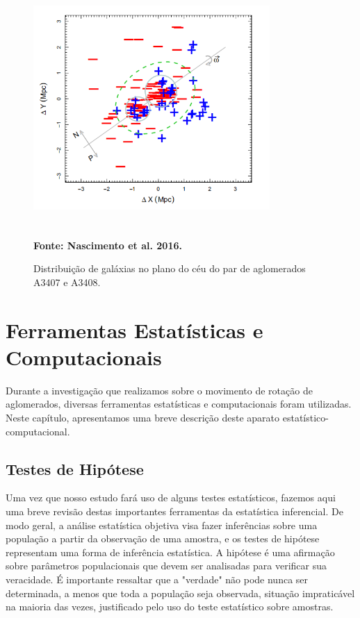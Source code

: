 \begin{figure}[H] %
\vspace{-2pt}
\begin{center}
\includegraphics[height=9cm,width=9cm]{04-figuras/nascimento.png}%
\caption{Distribuição de galáxias no plano do céu do par de aglomerados A3407 e A3408.}
 \textbf{Fonte: Nascimento et al. 2016.}
\label{fig3}%
\end{center}
\end{figure}

\chapter{Ferramentas Estatísticas e Computacionais}

Durante a investigação que realizamos sobre o movimento de rotação de aglomerados, diversas
ferramentas estatísticas e computacionais foram utilizadas. Neste capítulo, apresentamos uma
breve descrição deste aparato estatístico-computacional.

\section{Testes de Hipótese}

Uma vez que nosso estudo fará uso de alguns testes estatísticos, fazemos aqui uma breve revisão destas importantes ferramentas da estatística inferencial.
De modo geral, a análise estatística objetiva visa fazer inferências sobre uma população a partir da observação de uma amostra, e os testes de hipótese representam uma forma de inferência estatística. A hipótese é uma afirmação sobre parâmetros populacionais que devem ser analisadas para verificar sua veracidade. É importante ressaltar que a "verdade" não  pode nunca ser determinada, a menos que toda a população seja observada, situação impraticável na maioria das vezes, justificado pelo uso do teste estatístico sobre amostras.

